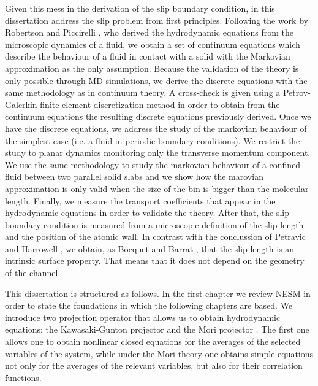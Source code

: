 \documentclass[b5paper,openright,10pt]{book}
\begin{document}
Given this mess in the derivation of the slip boundary condition, in this dissertation address the slip problem from first principles. Following the work by Robertson \cite{Robertson1966} and Piccirelli \cite{Piccirelli1968}, who derived the hydrodynamic equations from the microscopic dynamics of a fluid, we obtain a set of continuum equations which describe the behaviour of a fluid in contact with a solid with the Markovian approximation as the only assumption. 
Because the validation of the theory is only possible through MD simulations, we derive the discrete equations with the same methodology as in continuum theory. 
A cross-check is given using a Petrov-Galerkin  finite element discretization method in order to obtain from the continuum equations the resulting discrete equations previously derived.  
Once we have the discrete equations, we address the study of the markovian behaviour of the simplest case (i.e. a fluid in periodic boundary conditions). We restrict the study to planar dynamics monitoring only the transverse momentum component. We use the same methodology to study the markovian behaviour of a confined fluid between two parallel solid slabs and we show how the marovian approximation is only valid when the size of the bin is bigger than the molecular length. Finally, we measure the transport coefficients that appear in the hydrodynamic equations in order to validate the theory. 
After that, the slip boundary condition is measured from a microscopic definition of the slip length and the position of the atomic wall.
In contrast with the conclussion of Petravic and Harrowell \cite{Petravic2007}, we obtain, as Bocquet and Barrat \cite{Bocquet1994}, that the slip length is an intrinsic surface property. That means that it does not depend on the geometry of the channel. 

This dissertation is structured as follows. 
In the first chapter we review NESM in order to state the foundations in which the following chapters are based. 
We introduce two projection operator that allows us to obtain hydrodynamic equations: the Kawasaki-Gunton projector \cite{Kawasaki1973} and the Mori projector \cite{Mori1965}.  The first one allows one to obtain  nonlinear closed equations
for  the  averages  of   the  selected  variables of the system, while under the Mori theory one obtains simple equations not only for the averages of the relevant variables, but also for their correlation functions. 
\end{document}
